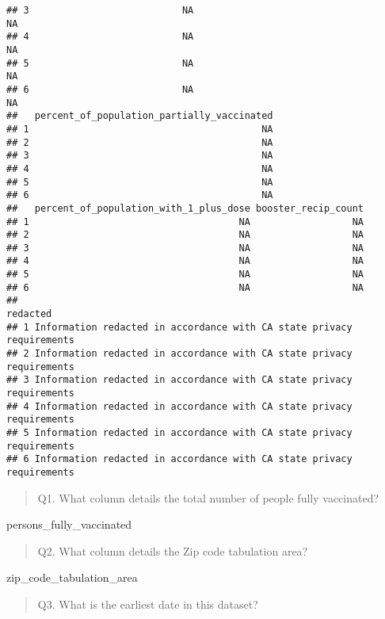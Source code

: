 \documentclass[
]{article}
\newenvironment{Shaded}{\begin{snugshade}}{\end{snugshade}}
\newcommand{\FunctionTok}[1]{\textcolor[rgb]{0.00,0.00,0.00}{#1}}
\newcommand{\NormalTok}[1]{#1}
\newcommand{\SpecialCharTok}[1]{\textcolor[rgb]{0.00,0.00,0.00}{#1}}
\begin{document}
\begin{verbatim}
## 3                           NA                                     NA
## 4                           NA                                     NA
## 5                           NA                                     NA
## 6                           NA                                     NA
##   percent_of_population_partially_vaccinated
## 1                                         NA
## 2                                         NA
## 3                                         NA
## 4                                         NA
## 5                                         NA
## 6                                         NA
##   percent_of_population_with_1_plus_dose booster_recip_count
## 1                                     NA                  NA
## 2                                     NA                  NA
## 3                                     NA                  NA
## 4                                     NA                  NA
## 5                                     NA                  NA
## 6                                     NA                  NA
##                                                                redacted
## 1 Information redacted in accordance with CA state privacy requirements
## 2 Information redacted in accordance with CA state privacy requirements
## 3 Information redacted in accordance with CA state privacy requirements
## 4 Information redacted in accordance with CA state privacy requirements
## 5 Information redacted in accordance with CA state privacy requirements
## 6 Information redacted in accordance with CA state privacy requirements
\end{verbatim}

\begin{quote}
Q1. What column details the total number of people fully vaccinated?
\end{quote}

persons\_fully\_vaccinated

\begin{quote}
Q2. What column details the Zip code tabulation area?
\end{quote}

zip\_code\_tabulation\_area

\begin{quote}
Q3. What is the earliest date in this dataset?
\end{quote}

\begin{Shaded}
\end{Shaded}
\end{document}
